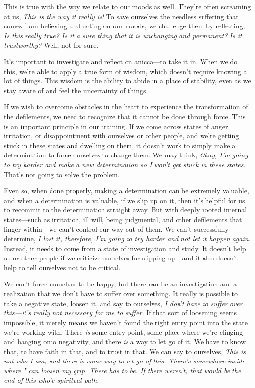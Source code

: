 This is true with the way we relate to our moods as well. They're often 
screaming at us, \emph{This is the way it really is!} To save ourselves 
the needless suffering that comes from believing and acting on our 
moods, we challenge them by reflecting, \emph{Is this really true? Is 
it a sure thing that it is unchanging and permanent? Is it 
trustworthy?} Well, not for sure.

It's important to investigate and reflect on anicca---to take it in. 
When we do this, we're able to apply a true form of wisdom, which 
doesn't require knowing a lot of things. This wisdom is the ability to 
abide in a place of stability, even as we stay aware of and feel the 
uncertainty of things.


If we wish to overcome obstacles in the heart to experience the 
transformation of the defilements, we need to recognize that it cannot 
be done through force. This is an important principle in our training. 
If we come across states of anger, irritation, or disappointment with 
ourselves or other people, and we're getting stuck in these states and 
dwelling on them, it doesn't work to simply make a determination to 
force ourselves to change them. We may think, \emph{Okay, I'm going to 
try harder and make a new determination so I won't get stuck in these 
states.} That's not going to solve the problem.

Even so, when done properly, making a determination can be extremely 
valuable, and when a determination is valuable, if we slip up on it, 
then it's helpful for us to recommit to the determination straight 
away. But with deeply rooted internal states---such as irritation, ill 
will, being judgmental, and other defilements that linger within---we 
can't control our way out of them. We can't successfully determine, 
\emph{I lost it, therefore, I'm going to try harder and not let it 
happen again.} Instead, it needs to come from a state of investigation 
and study. It doesn't help us or other people if we criticize ourselves 
for slipping up---and it also doesn't help to tell ourselves not to be 
critical.

We can't force ourselves to be happy, but there can be an investigation 
and a realization that we don't have to suffer over something. It 
really is possible to take a negative state, loosen it, and say to 
ourselves, \emph{I don't have to suffer over this---it's really not 
necessary for me to suffer.} If that sort of loosening seems 
impossible, it merely means we haven't found the right entry point into 
the state we're working with. There \emph{is} some entry point, some 
place where we're clinging and hanging onto negativity, and there 
\emph{is} a way to let go of it. We have to know that, to have faith in 
that, and to trust in that. We can say to ourselves, \emph{This is not 
who I am, and there is some way to let go of this. There's somewhere 
inside where I can loosen my grip. There has to be. If there weren't, 
that would be the end of this whole spiritual path.}

